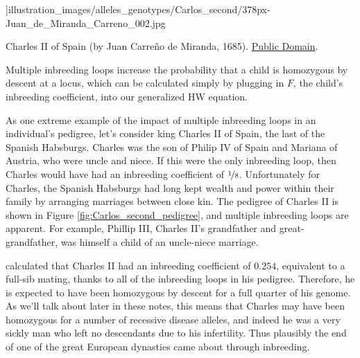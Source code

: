 {{\begin{marginfigure}
\begin{center}
  \textwidth]{illustration_images/alleles_genotypes/Carlos_second/378px-Juan_de_Miranda_Carreno_002.jpg}
\end{center}
\caption{Charles II of Spain (by Juan Carre\~{n}o de Miranda,
  1685). \href{https://it.wikipedia.org/wiki/Carlo_II_di_Spagna\#/media/File:Juan_de_Miranda_Carreno_002.jpg}{Public Domain}.} \label{fig:Carlos_second}
\end{marginfigure}
Multiple inbreeding loops increase the probability that a child
is homozygous by descent at a locus, which can be calculated simply by plugging in $F$, the child's
inbreeding coefficient, into our generalized HW equation.


As one extreme example of the impact of multiple inbreeding loops in
an individual's pedigree, let's consider king Charles II of
Spain, the last of the Spanish Habsburgs.  Charles was the son of
Philip IV of Spain and Mariana of Austria, who were uncle and
niece. If this were the only inbreeding loop, then Charles would have had an
inbreeding coefficient of $\nicefrac{1}{8}$. Unfortunately for Charles, the
Spanish Habsburgs had long kept wealth and power within their family
by arranging marriages between close kin. The pedigree of Charles II is shown in Figure \ref{fig:Carlos_second_pedigree}, and
multiple inbreeding loops are apparent. For example, Phillip III,
Charles II's grandfather and great-grandfather, was himself a child of
an uncle-niece marriage.

\citet{alvarez:09} calculated that Charles II had an inbreeding
coefficient of $0.254$, equivalent to a full-sib mating,
thanks to all of the inbreeding loops in his pedigree. Therefore, he
is expected to have been homozygous by descent for a full quarter of his
genome. As we'll talk about later in these notes, this means that Charles
may have been homozygous for a number of recessive disease alleles,
and indeed he was a very sickly man who left no descendants due to his
infertility.  Thus plausibly the end of one of the great
European dynasties came about through inbreeding. 


}}
